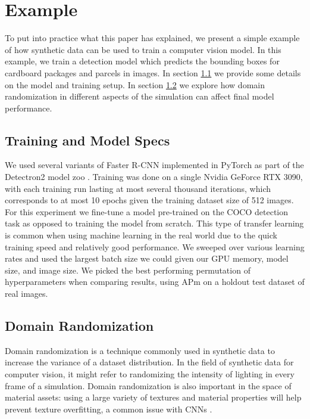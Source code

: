 \documentclass{article}
\begin{document}
\section{Example}
\label{sec:example}

To put into practice what this paper has explained, we present a simple example of how synthetic data can be used to train a computer vision model. In this example, we train a detection model which predicts the bounding boxes for cardboard packages and parcels in images. In section \ref{sec:trainingmodel} we provide some details on the model and training setup. In section \ref{sec:domainrandomization} we explore how domain randomization in different aspects of the simulation can affect final model performance.

\subsection{Training and Model Specs}
\label{sec:trainingmodel}

We used several variants of Faster R-CNN implemented in PyTorch as part of the Detectron2 model zoo \cite{wu2019detectron2}. Training was done on a single Nvidia GeForce RTX 3090, with each training run lasting at most several thousand iterations, which corresponds to at most 10 epochs given the training dataset size of 512 images. For this experiment we fine-tune a model pre-trained on the COCO detection task as opposed to training the model from scratch. This type of transfer learning is common when using machine learning in the real world due to the quick training speed and relatively good performance. We sweeped over various learning rates and used the largest batch size we could given our GPU memory, model size, and image size. We picked the best performing permutation of hyperparameters when comparing results, using APm on a holdout test dataset of real images.

\subsection{Domain Randomization}
\label{sec:domainrandomization}

Domain randomization is a technique commonly used in synthetic data to increase the variance of a dataset distribution. In the field of synthetic data for computer vision, it might refer to randomizing the intensity of lighting in every frame of a simulation. Domain randomization is also important in the space of material assets: using a large variety of textures and material properties will help prevent texture overfitting, a common issue with CNNs \cite{DBLP:journals/corr/abs-1811-12231}. 
\end{document}

